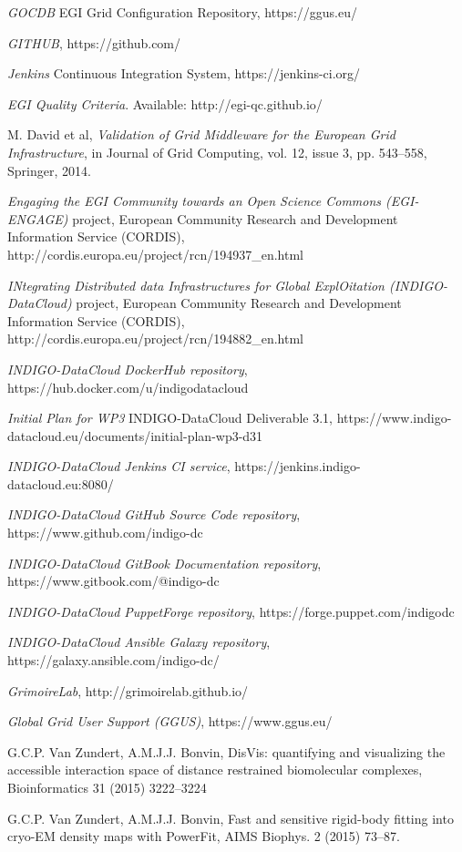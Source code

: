 \documentclass[journal]{IEEEtran}
\begin{document}
\begin{thebibliography}{1}
\emph{GOCDB} EGI Grid Configuration Repository,
https://ggus.eu/

\emph{GITHUB},
https://github.com/

\emph{Jenkins} Continuous Integration System,
https://jenkins-ci.org/

\emph{EGI Quality Criteria}. Available: http://egi-qc.github.io/

M. David et al, \emph{Validation of Grid Middleware for the European Grid
Infrastructure}, in Journal of Grid Computing, vol. 12, issue 3, pp. 543–558,
Springer, 2014.

\emph{Engaging the EGI Community towards an Open Science Commons (EGI-ENGAGE)}
project, European Community Research and Development Information Service
(CORDIS), http://cordis.europa.eu/project/rcn/194937\_en.html

\emph{INtegrating Distributed data Infrastructures for Global ExplOitation
(INDIGO-DataCloud)} project, European Community Research and Development
Information Service (CORDIS),
http://cordis.europa.eu/project/rcn/194882\_en.html

\emph{INDIGO-DataCloud DockerHub repository},
https://hub.docker.com/u/indigodatacloud

\emph{Initial Plan for WP3} INDIGO-DataCloud Deliverable 3.1,
https://www.indigo-datacloud.eu/documents/initial-plan-wp3-d31

\emph{INDIGO-DataCloud Jenkins CI service},
https://jenkins.indigo-datacloud.eu:8080/

\emph{INDIGO-DataCloud GitHub Source Code repository},
https://www.github.com/indigo-dc

\emph{INDIGO-DataCloud GitBook Documentation repository},
https://www.gitbook.com/@indigo-dc

\emph{INDIGO-DataCloud PuppetForge repository},
https://forge.puppet.com/indigodc

\emph{INDIGO-DataCloud Ansible Galaxy repository},
https://galaxy.ansible.com/indigo-dc/

\emph{GrimoireLab}, http://grimoirelab.github.io/

\emph{Global Grid User Support (GGUS)}, https://www.ggus.eu/

 G.C.P. Van Zundert, A.M.J.J. Bonvin,
DisVis: quantifying and visualizing the accessible interaction space of distance
restrained biomolecular complexes, Bioinformatics 31 (2015) 3222–3224

 G.C.P. Van Zundert, A.M.J.J. Bonvin,
Fast and sensitive rigid-body fitting into cryo-EM density maps with PowerFit,
AIMS Biophys. 2 (2015) 73–87.

\end{thebibliography}
\end{document}
